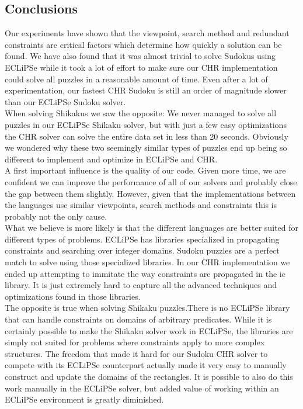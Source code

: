 \documentclass[a4paper,10pt]{article}
\begin{document}
\subsection{Conclusions}
Our experiments have shown that the viewpoint, search method and redundant constraints are critical factors which determine how quickly a solution can be found. We have also found that it was almost trivial to solve Sudokus using ECLiPSe while it took a lot of effort to make sure our CHR implementation could solve all puzzles in a reasonable amount of time. Even after a lot of experimentation, our fastest CHR Sudoku is still an order of magnitude slower than our ECLiPSe Sudoku solver. \\
When solving Shikakus we saw the opposite: We never managed to solve all puzzles in our ECLiPSe Shikaku solver, but with just a few easy optimizations the CHR solver can solve the entire data set in less than 20 seconds. Obviously we wondered why these two seemingly similar types of puzzles end up being so different to implement and optimize in ECLiPSe and CHR. 
\\ A first important influence is the quality of our code. Given more time, we are confident we can improve the performance of all of our solvers and probably close the gap between them slightly. However, given that the implementations between the languages use similar viewpoints, search methods and constraints this is probably not the only cause. \\
What we believe is more likely is that the different languages are better suited for different types of problems. ECLiPSe has libraries specialized in propagating constraints and searching over integer domains. Sudoku puzzles are a perfect match to solve using those specialized libraries. In our CHR implementation we ended up attempting to immitate the way constraints are propagated in the ic library. It is just extremely hard to capture all the advanced techniques and optimizations found in those libraries. \\
The opposite is true when solving Shikaku puzzles.There is no ECLiPSe library that can handle constraints on domains of arbitrary predicates. While it is certainly possible to make the Shikaku solver work in ECLiPSe, the libraries are simply not suited for problems where constraints apply to more complex structures. The freedom that made it hard for our Sudoku CHR solver to compete with its ECLiPSe counterpart actually made it very easy to manually construct and update the domains of the rectangles. It is possible to also do this work manually in the ECLiPSe solver, but added value of working within an ECLiPSe environment is greatly diminished.



 

\appendix
\end{document}
